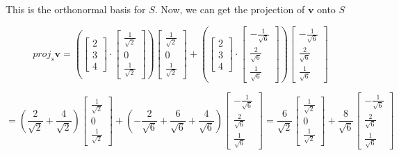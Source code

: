\documentclass{report}
\begin{document}
This is the orthonormal basis for $S$. Now, we can get the projection of $\bm{v}$ onto $S$

$$
proj_{s} \bm{v} = \left( \begin{bmatrix} 2 \\ 3 \\ 4 \end{bmatrix} \cdot  \begin{bmatrix} \frac{1}{\sqrt{2}} \\ 0 \\ \frac{1}{\sqrt{2}} \end{bmatrix} \right)  \begin{bmatrix} \frac{1}{\sqrt{2}} \\ 0 \\ \frac{1}{\sqrt{2}} \end{bmatrix} + \left( \begin{bmatrix} 2 \\ 3 \\ 4 \end{bmatrix} \cdot  \begin{bmatrix} - \frac{1}{\sqrt{6}} \\ \frac{2}{\sqrt{6}} \\ \frac{1}{\sqrt{6}} \end{bmatrix} \right) \begin{bmatrix} - \frac{1}{\sqrt{6}} \\ \frac{2}{\sqrt{6}} \\ \frac{1}{\sqrt{6}} \end{bmatrix} 
$$

$$
= \left( \frac{2}{\sqrt{2}} + \frac{4}{\sqrt{2}} \right) \begin{bmatrix} \frac{1}{\sqrt{2}} \\ 0 \\ \frac{1}{\sqrt{2}} \end{bmatrix} + \left( -\frac{2}{\sqrt{6}} + \frac{6}{\sqrt{6}} + \frac{4}{\sqrt{6}} \right) \begin{bmatrix} -\frac{1}{\sqrt{6}} \\ \frac{2}{\sqrt{6}} \\ \frac{1}{\sqrt{6}} \end{bmatrix} = \frac{6}{\sqrt{2}} \begin{bmatrix} \frac{1}{\sqrt{2}} \\ 0 \\ \frac{1}{\sqrt{2}} \end{bmatrix} + \frac{8}{\sqrt{6}} \begin{bmatrix} -\frac{1}{\sqrt{6}} \\ \frac{2}{\sqrt{6}} \\ \frac{1}{\sqrt{6}} \end{bmatrix} 
$$
\end{document}
